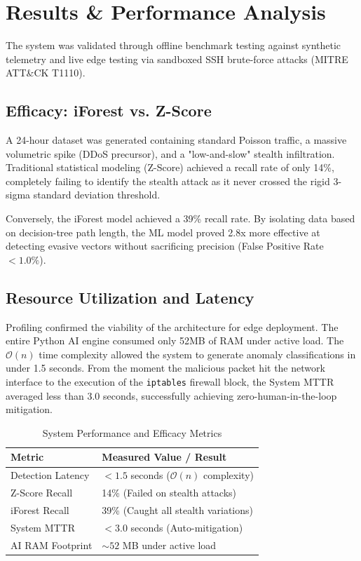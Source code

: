 \documentclass[conference]{IEEEtran}
\begin{document}
	\section{Results \& Performance Analysis}
	The system was validated through offline benchmark testing against synthetic telemetry and live edge testing via sandboxed SSH brute-force attacks (MITRE ATT\&CK T1110).
	
	\subsection{Efficacy: iForest vs. Z-Score}
	A 24-hour dataset was generated containing standard Poisson traffic, a massive volumetric spike (DDoS precursor), and a "low-and-slow" stealth infiltration. Traditional statistical modeling (Z-Score) achieved a recall rate of only 14\%, completely failing to identify the stealth attack as it never crossed the rigid 3-sigma standard deviation threshold. 
	
	Conversely, the iForest model achieved a 39\% recall rate. By isolating data based on decision-tree path length, the ML model proved 2.8x more effective at detecting evasive vectors without sacrificing precision (False Positive Rate $< 1.0\%$).
	
	\subsection{Resource Utilization and Latency}
	Profiling confirmed the viability of the architecture for edge deployment. The entire Python AI engine consumed only 52MB of RAM under active load. The $\mathcal{O}(n)$ time complexity allowed the system to generate anomaly classifications in under 1.5 seconds. From the moment the malicious packet hit the network interface to the execution of the \texttt{iptables} firewall block, the System MTTR averaged less than 3.0 seconds, successfully achieving zero-human-in-the-loop mitigation.
	
	\begin{table}[htbp]
		\centering
		\caption{System Performance and Efficacy Metrics}
		\vspace{0.1cm}
		\begin{tabularx}{\columnwidth}{@{} l X @{}}
			\toprule
			\textbf{Metric} & \textbf{Measured Value / Result} \\
			\midrule
			Detection Latency & $< 1.5$ seconds ($\mathcal{O}(n)$ complexity) \\
			\addlinespace
			Z-Score Recall & 14\% (Failed on stealth attacks) \\
			\addlinespace
			iForest Recall & 39\% (Caught all stealth variations) \\
			\addlinespace
			System MTTR & $< 3.0$ seconds (Auto-mitigation) \\
			\addlinespace
			AI RAM Footprint & $\sim 52$ MB under active load \\
			\bottomrule
		\end{tabularx}
		\label{tab:performance}
	\end{table}
	
\end{document}
